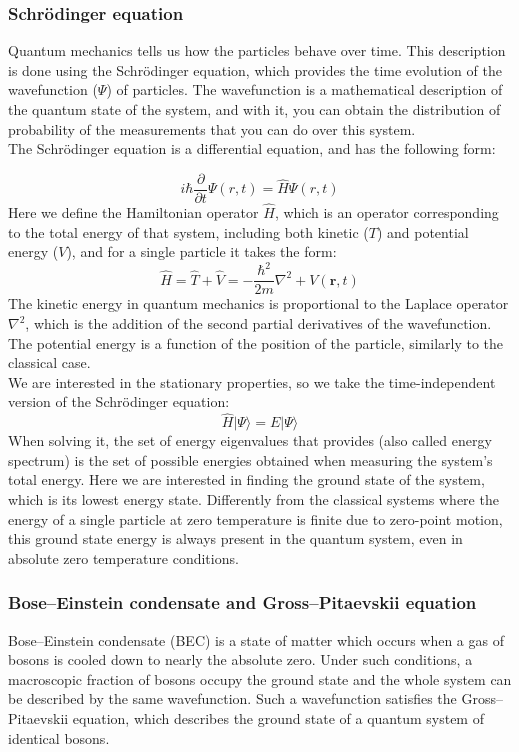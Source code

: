 \documentclass{article}
\begin{document}
\subsubsection{Schrödinger equation}
Quantum mechanics tells us how the particles behave over time. This description is done using the Schrödinger equation, which provides the time evolution of the wavefunction ($\Psi$) of particles. The wavefunction is a mathematical description of the quantum state of the system, and with it, you can obtain the distribution of probability of the measurements that you can do over this system.\\

The Schrödinger equation is a differential equation, and has the following form:

\begin{equation}
i\hbar\frac{\partial}{\partial t}\Psi\left(r,t\right)=\hat{H}\Psi\left(r,t\right)
\end{equation}
Here we define the Hamiltonian operator $\hat{H}$, which is an operator corresponding to the total energy of that system, including both kinetic ($T$) and potential energy ($V$), and for a single particle it takes the form:
\begin{equation}
\hat{H}=\hat{T}+\hat{V}=-\frac{\hbar^2}{2m}\nabla^2+V\left(\mathbf{r},t\right)
\end{equation}
The kinetic energy in quantum mechanics is proportional to the Laplace operator $\nabla^2$, which is the addition of the second partial derivatives of the wavefunction. The potential energy is a function of the position of the particle, similarly to the classical case.\\

We are interested in the stationary properties, so we take the time-independent version of the Schrödinger equation:
\begin{equation}
\hat {H} |\Psi \rangle = E |\Psi \rangle
\end{equation}
When solving it, the set of energy eigenvalues that provides (also called energy spectrum) is the set of possible energies obtained when measuring the system’s total energy. Here we are interested in finding the ground state of the system, which is its lowest energy state. Differently from the classical systems where the energy of a single particle at zero temperature is finite due to zero-point motion, this ground state energy is always present in the quantum system, even in absolute zero temperature conditions. 

\subsubsection{Bose–Einstein condensate and Gross–Pitaevskii equation}
Bose–Einstein condensate \cite{BEC} (BEC) is a state of matter which occurs when a gas of bosons is cooled down to nearly the absolute zero. Under such conditions, a macroscopic fraction of bosons occupy the ground state and the whole system can be described by the same wavefunction. Such a wavefunction satisfies the Gross–Pitaevskii equation, which describes the ground state of a quantum system of identical bosons. 
\end{document}
